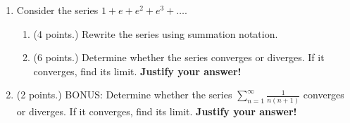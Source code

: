 \documentclass[12pt]{article}
\newcommand{\ds}{\displaystyle}
\newcommand{\points}[1]{(#1 points.)}		%
\begin{document}
\begin{enumerate}
\item Consider the series $1 + e + e^2 + e^3 + \dots$.
  \begin{enumerate}
  \item \points{4} Rewrite the series using summation notation.
    \vfill

  \item \points{6} Determine whether the series converges or diverges. If it
    converges, find its limit. {\bf Justify your answer!}
    \vfill
  \end{enumerate}
  
  \newpage

\item \points{2} BONUS: Determine whether the series $\ds
  \sum_{n=1}^{\infty} \frac{1}{n(n+1)}$ converges or diverges. If it
  converges, find its limit. {\bf Justify your answer!}
  
\end{enumerate}
\end{document}
